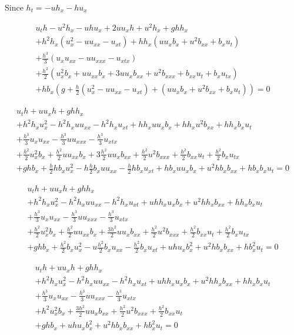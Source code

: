 \documentclass[12pt]{article}
\begin{document}
Since $h_t = - uh_x - hu_x$

\begin{multline*}
u_th - u^2h_x - uhu_x + 2uu_xh + u^2h_x + ghh_x    \\ + h^2h_x\left(u_x^2 - uu_{xx} - u_{xt}\right) + hh_x\left(uu_xb_x + u^2 b_{xx} + b_xu_t\right) \\ + \frac{h^3}{3}\left(u_xu_{xx} - u u_{xxx} - u_{xtx}\right)  \\ + \frac{h^2}{2} \left( u_x^2b_x + uu_{xx}b_x + 3uu_xb_{xx}+ u^2b_{xxx}  + b_{xx}u_t + b_xu_{tx}\right) \\ + h b_x\left(g +  \frac{h}{2}\left(u_x^2 - uu_{xx} - u_{xt}\right) + \left(uu_xb_x + u^2 b_{xx} + b_xu_t\right)\right) = 0
\end{multline*}

\begin{multline*}
u_th + uu_xh + ghh_x \\ + h^2h_xu_x^2 - h^2h_xuu_{xx} - h^2h_xu_{xt} + hh_xuu_xb_x + hh_xu^2 b_{xx} + hh_xb_xu_t \\ + \frac{h^3}{3}u_xu_{xx} - \frac{h^3}{3}u u_{xxx} - \frac{h^3}{3}u_{xtx}  \\ +  \frac{h^2}{2}u_x^2b_x + \frac{h^2}{2}uu_{xx}b_x + 3\frac{h^2}{2}uu_xb_{xx}+ \frac{h^2}{2}u^2b_{xxx}  + \frac{h^2}{2}b_{xx}u_t + \frac{h^2}{2}b_xu_{tx} \\ + gh b_x +  \frac{h}{2}h b_xu_x^2 - h \frac{h}{2}b_xuu_{xx} - \frac{h}{2}h b_xu_{xt} + h b_xuu_xb_x + u^2 h b_xb_{xx} + h b_xb_xu_t = 0
\end{multline*}

\begin{multline*}
u_th + uu_xh + ghh_x \\ + h^2h_xu_x^2 - h^2h_xuu_{xx} - h^2h_xu_{xt} + uhh_xu_xb_x + u^2hh_xb_{xx} + hh_xb_xu_t \\ + \frac{h^3}{3}u_xu_{xx} - \frac{h^3}{3}u u_{xxx} - \frac{h^3}{3}u_{xtx}  \\ +  \frac{h^2}{2}u_x^2b_x + \frac{h^2}{2}uu_{xx}b_x + \frac{3h^2}{2}uu_xb_{xx}+ \frac{h^2}{2}u^2b_{xxx}  + \frac{h^2}{2}b_{xx}u_t + \frac{h^2}{2}b_xu_{tx} \\ + gh b_x +  \frac{h^2}{2} b_xu_x^2 - u\frac{h^2}{2}b_xu_{xx} - \frac{h^2}{2} b_xu_{xt} + uh u_xb_x^2 + u^2 h b_xb_{xx} + h b_x^2u_t = 0
\end{multline*}

\begin{multline*}
u_th + uu_xh + ghh_x \\ + h^2h_xu_x^2 - h^2h_xuu_{xx} - h^2h_xu_{xt} + uhh_xu_xb_x + u^2hh_xb_{xx} + hh_xb_xu_t \\ + \frac{h^3}{3}u_xu_{xx} - \frac{h^3}{3}u u_{xxx} - \frac{h^3}{3}u_{xtx}  \\ +  h^2u_x^2b_x  + \frac{3h^2}{2}uu_xb_{xx}+ \frac{h^2}{2}u^2b_{xxx}  + \frac{h^2}{2}b_{xx}u_t  \\ + gh b_x  + uh u_xb_x^2 + u^2 h b_xb_{xx} + h b_x^2u_t = 0
\end{multline*}
\end{document}
